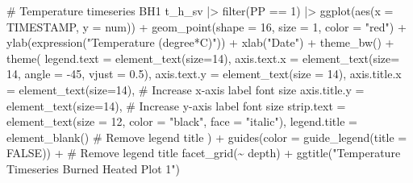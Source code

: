 \documentclass[
  letterpaper,
  DIV=11,
  numbers=noendperiod]{scrartcl}
\newenvironment{Shaded}{\begin{snugshade}}{\end{snugshade}}
\newcommand{\AttributeTok}[1]{\textcolor[rgb]{0.40,0.45,0.13}{#1}}
\newcommand{\CommentTok}[1]{\textcolor[rgb]{0.37,0.37,0.37}{#1}}
\newcommand{\ConstantTok}[1]{\textcolor[rgb]{0.56,0.35,0.01}{#1}}
\newcommand{\DecValTok}[1]{\textcolor[rgb]{0.68,0.00,0.00}{#1}}
\newcommand{\FloatTok}[1]{\textcolor[rgb]{0.68,0.00,0.00}{#1}}
\newcommand{\FunctionTok}[1]{\textcolor[rgb]{0.28,0.35,0.67}{#1}}
\newcommand{\NormalTok}[1]{\textcolor[rgb]{0.00,0.23,0.31}{#1}}
\newcommand{\SpecialCharTok}[1]{\textcolor[rgb]{0.37,0.37,0.37}{#1}}
\newcommand{\StringTok}[1]{\textcolor[rgb]{0.13,0.47,0.30}{#1}}
\begin{document}
\begin{Shaded}
\begin{Highlighting}[]
\CommentTok{\# Temperature timeseries BH1}
\NormalTok{t\_h\_sv }\SpecialCharTok{|\textgreater{}}
  \FunctionTok{filter}\NormalTok{(PP }\SpecialCharTok{==} \DecValTok{1}\NormalTok{) }\SpecialCharTok{|\textgreater{}}
  \FunctionTok{ggplot}\NormalTok{(}\FunctionTok{aes}\NormalTok{(}\AttributeTok{x =}\NormalTok{ TIMESTAMP, }\AttributeTok{y =}\NormalTok{ num)) }\SpecialCharTok{+}
  \FunctionTok{geom\_point}\NormalTok{(}\AttributeTok{shape =} \DecValTok{16}\NormalTok{, }\AttributeTok{size =} \DecValTok{1}\NormalTok{, }\AttributeTok{color =} \StringTok{"red"}\NormalTok{) }\SpecialCharTok{+}
  \FunctionTok{ylab}\NormalTok{(}\FunctionTok{expression}\NormalTok{(}\StringTok{"Temperature (degree*C)"}\NormalTok{)) }\SpecialCharTok{+}
  \FunctionTok{xlab}\NormalTok{(}\StringTok{"Date"}\NormalTok{) }\SpecialCharTok{+}
  \FunctionTok{theme\_bw}\NormalTok{() }\SpecialCharTok{+}
  \FunctionTok{theme}\NormalTok{(}
    \AttributeTok{legend.text =} \FunctionTok{element\_text}\NormalTok{(}\AttributeTok{size=}\DecValTok{14}\NormalTok{),}
    \AttributeTok{axis.text.x =} \FunctionTok{element\_text}\NormalTok{(}\AttributeTok{size=} \DecValTok{14}\NormalTok{, }\AttributeTok{angle =} \SpecialCharTok{{-}}\DecValTok{45}\NormalTok{, }\AttributeTok{vjust =} \FloatTok{0.5}\NormalTok{),}
    \AttributeTok{axis.text.y =} \FunctionTok{element\_text}\NormalTok{(}\AttributeTok{size =} \DecValTok{14}\NormalTok{),}
    \AttributeTok{axis.title.x =} \FunctionTok{element\_text}\NormalTok{(}\AttributeTok{size=}\DecValTok{14}\NormalTok{),  }\CommentTok{\# Increase x{-}axis label font size}
    \AttributeTok{axis.title.y =} \FunctionTok{element\_text}\NormalTok{(}\AttributeTok{size=}\DecValTok{14}\NormalTok{),  }\CommentTok{\# Increase y{-}axis label font size}
    \AttributeTok{strip.text =} \FunctionTok{element\_text}\NormalTok{(}\AttributeTok{size =} \DecValTok{12}\NormalTok{, }\AttributeTok{color =} \StringTok{"black"}\NormalTok{, }\AttributeTok{face =} \StringTok{"italic"}\NormalTok{),}
    \AttributeTok{legend.title =} \FunctionTok{element\_blank}\NormalTok{()  }\CommentTok{\# Remove legend title}
\NormalTok{  ) }\SpecialCharTok{+}
  \FunctionTok{guides}\NormalTok{(}\AttributeTok{color =} \FunctionTok{guide\_legend}\NormalTok{(}\AttributeTok{title =} \ConstantTok{FALSE}\NormalTok{)) }\SpecialCharTok{+}  \CommentTok{\# Remove legend title}
  \FunctionTok{facet\_grid}\NormalTok{(}\SpecialCharTok{\textasciitilde{}}\NormalTok{ depth) }\SpecialCharTok{+}
  \FunctionTok{ggtitle}\NormalTok{(}\StringTok{"Temperature Timeseries Burned Heated Plot 1"}\NormalTok{)}
\end{Highlighting}
\end{Shaded}
\end{document}
